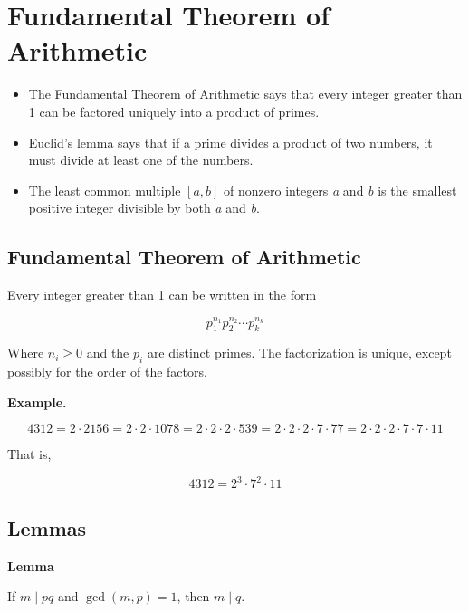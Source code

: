 \newpage
\section{Fundamental Theorem of Arithmetic}

\begin{itemize}

	\item The Fundamental Theorem of Arithmetic says that every integer greater than 1 can be factored 
		 uniquely into a product of primes.
	
	\item Euclid’s lemma says that if a prime divides a product of two numbers, it must divide at least 
		  one of the numbers.
	
	\item The least common multiple \([a, b]\) of nonzero integers \emph{a} and \emph{b} is the smallest positive 
	      integer divisible by both \emph{a} and \emph{b}.

\end{itemize}

\subsection{Fundamental Theorem of Arithmetic}

Every integer greater than 1 can be written in the form

\[
	p_1^{n_1}p_2^{n_2} \cdots p_k^{n_k}
\]

Where \(n_i \geq 0\) and the \(p_i\) are distinct primes. The factorization is unique, except possibly for 
the order of the factors.
\vspace{\baselineskip}

\textbf{Example.}

\[
	4312 = 2 \cdot 2156 = 2 \cdot 2 \cdot 1078 = 2 \cdot 2 \cdot 2 \cdot 539 = 2 \cdot 2 \cdot 2 \cdot 7 
	\cdot 77 = 2 \cdot 2 \cdot 2 \cdot 7 \cdot 7 \cdot 11
\]

That is,

\[
	4312 = 2^3 \cdot 7^2 \cdot 11
\]

\subsection{Lemmas}

\textbf{Lemma} 

If \(m \mid pq\) and \(\gcd(m, p) = 1\), then \(m \mid q\).
\vspace{\baselineskip}

